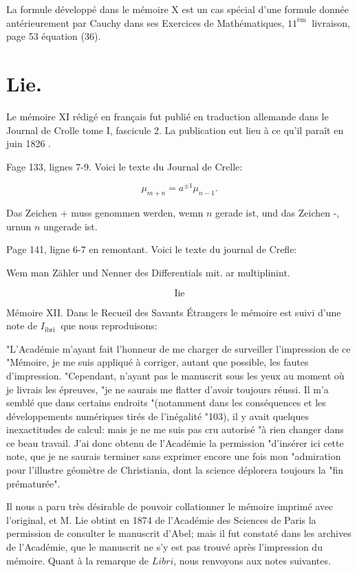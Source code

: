\documentclass{article}
\begin{document}
La formule développé dans le mémoire \(\mathrm{X}\) est un cas spécial d'une formule donnée antérieurement par Cauchy dans ses Exercices de Mathématiques, \(11^{\text {èm }}\) livraison, page 53 équation (36).

\section*{Lie.}

Le mémoire XI rédigé en français fut publié en traduction allemande dans le Journal de Crolle tome I, fascicule 2. La publication eut lieu à ce qu'il paraît en juin 1826 .

Fage 133, lignes 7-9. Voici le texte du Journal de Crelle:

\[
\mu_{m+n}=a^{ \pm 1} \mu_{n-1} .
\]

Das Zeichen + muss genommen werden, wemn \(n\) gerade ist, und das Zeichen -, urnun \(n\) ungerade ist.

Page 141, ligne 6-7 en remontant. Voici le texte du journal de Crefle:

Wem man Zähler und Nenner des Differentials mit. ar multiplinint.

\[
\text { Iie }
\]

Mémoire XII. Dans le Recueil des Savants Étrangers le mémoire est suivi d'une note de \(I_{\text {ibri }}\) que nous reproduisons:

"L'Académie m'ayant fait l'honneur de me charger de surveiller l'impression de ce "Mémoire, je me suis appliqué à corriger, autant que possible, les fautes d'impression. "Cependant, n'ayant pas le manuscrit sous les yeux au moment où je livrais les épreuves, "je ne saurais me flatter d'avoir toujours réussi. Il m'a semblé que dans certains endroits "(notamment dans les conséquences et les développements numériques tirés de l'inégalité "103), il y avait quelques inexactitudes de calcul: mais je ne me suis pas cru autorisé "à rien changer dans ce beau travail. J'ai donc obtenu de l'Académie la permission "d'insérer ici cette note, que je ne saurais terminer sans exprimer encore une fois mon "admiration pour l'illustre géomètre de Christiania, dont la science déplorera toujours la "fin prématurée".

Il nous a paru très désirable de pouvoir collationner le mémoire imprimé avec l'original, et M. Lie obtint en 1874 de l'Académie des Sciences de Paris la permission de consulter le manuscrit d'Abel; mais il fut constaté dans les archives de l'Académie, que le manuscrit ne s'y est pas trouvé après l'impression du mémoire. Quant à la remarque de \(L i b r i\), nous renvoyons aux notes suivantes.
\end{document}
